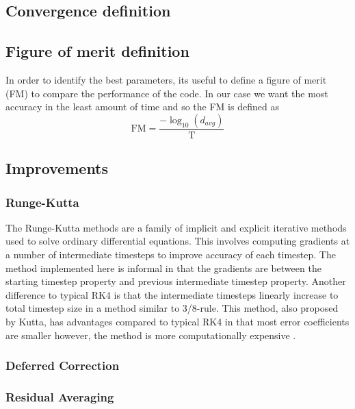 \documentclass{article}
\begin{document}
\subsection{Convergence definition}

\subsection{Figure of merit definition}
In order to identify the best parameters, its useful to define a figure of merit (FM) to compare the performance of the code.
In our case we want the most accuracy in the least amount of time and so the FM is defined as
\begin{equation}
    \text{FM} = \frac{-\log_{10}(d_{avg})}{\text{T}}
\end{equation}

\subsection{Improvements}
\subsubsection{Runge-Kutta}

The Runge-Kutta methods are a family of implicit and explicit iterative methods used to solve ordinary differential equations.
This involves computing gradients at a number of intermediate timesteps to improve accuracy of each timestep.
The method implemented here is informal in that the gradients are between the starting timestep property and previous intermediate timestep property.
Another difference to typical RK4 is that the intermediate timesteps linearly increase to total timestep size in a method similar to 3/8-rule.
This method, also proposed by Kutta, has advantages compared to typical RK4 in that most error coefficients are smaller however, the method is more computationally expensive \cite{solve_ODE_nonstiff}.


\subsubsection{Deferred Correction}



\subsubsection{Residual Averaging}
\end{document}
